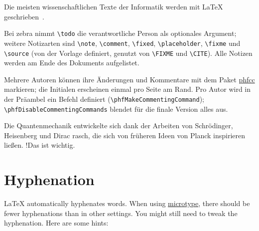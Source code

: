 \documentclass[../thesis-example]{subfiles}
\begin{document}
\begin{ltgexample}


Die meisten wissenschaftlichen Texte der Informatik werden mit \LaTeX{} geschrieben~.
\end{ltgexample}

Bei zebra nimmt \verb|\todo| die verantwortliche Person als optionales Argument; weitere Notizarten sind \verb|\note|, \verb|\comment|, \verb|\fixed|, \verb|\placeholder|, \verb|\fixme| und \verb|\source| (von der Vorlage definiert, genutzt von \verb|\FIXME| und \verb|\CITE|).
Alle Notizen werden am Ende des Dokuments aufgelistet.

\begin{ltgexample}




\end{ltgexample}


Mehrere Autoren können ihre Änderungen und Kommentare mit dem Paket \href{https://ctan.org/pkg/phfcc}{phfcc} markieren; die Initialen erscheinen einmal pro Seite am Rand.
Pro Autor wird in der Präambel ein Befehl definiert (\verb|\phfMakeCommentingCommand|); \verb|\phfDisableCommentingCommands| blendet für die finale Version alles aus.

\begin{ltgexample}
Die Quantenmechanik entwickelte sich dank der Arbeiten von Schrödinger, Heisenberg und Dirac rasch,
die sich von früheren Ideen von Planck   inspirieren ließen.
 \FA!{Das ist wichtig.}
\end{ltgexample}

\section{Hyphenation}

\LaTeX{} automatically hyphenates words.
When using \href{https://ctan.org/pkg/microtype}{microtype}, there should be fewer hyphenations than in other settings.
You might still need to tweak the hyphenation.
Here are some hints:
\end{document}
